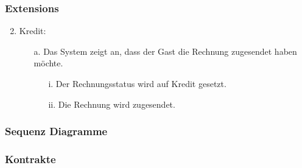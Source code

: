 \documentclass[./detailed_overview_usecases.tex]{subfiles}
\begin{document}
    \subsubsection*{Extensions}
    \begin{enumerate}
        \setcounter{enumi}{1}
        \item Kredit:
            \begin{itemize}
            \item[a.] Das System zeigt an, dass der Gast die Rechnung zugesendet haben möchte.
            \begin{itemize}
                \item[i.] Der Rechnungsstatus wird auf Kredit gesetzt.
                \item[ii.] Die Rechnung wird zugesendet.
            \end{itemize}
        \end{itemize}
    \end{enumerate}
    \subsubsection{Sequenz Diagramme}
    \subsubsection{Kontrakte}
\end{document}
